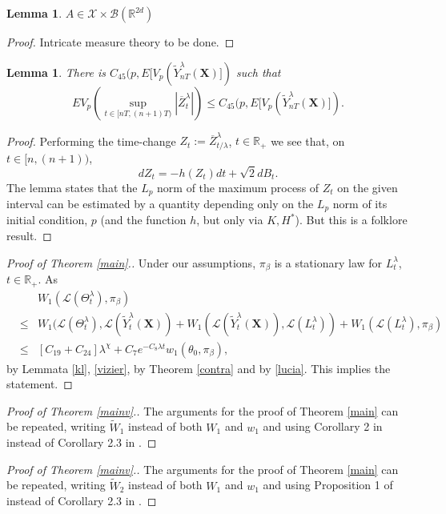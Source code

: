 \documentclass[a4paper,draft]{article}
\newtheorem{lemma}[theorem]{Lemma}
\begin{document}
\begin{lemma}
$A\in\mathcal{X}\times \mathcal{B}(\mathbb{R}^{2d})$
\end{lemma}
\begin{proof} Intricate measure theory to be done.
\end{proof}


\begin{lemma}\label{folklore} There is 
$C_{45}(p,E[V_p(\tilde{Y}^{\lambda}_{nT}(\mathbf{X})])$ such that
$$
EV_p(\sup_{t\in [nT,(n+1)T)}|\overline{Z}^{\lambda}_t|)\leq C_{45}(p,E[V_p(\tilde{Y}^{\lambda}_{nT}(\mathbf{X})]).
$$
\end{lemma}
\begin{proof}
Performing the time-change $Z_t:=\overline{Z}^{\lambda}_{t/\lambda}$, $t\in\mathbb{R}_+$ we see
that, on $t\in [n,(n+1))$,
$$
dZ_t=-h(Z_t)dt+\sqrt{2}dB_t.
$$
The lemma states that the $L_p$ norm of the maximum process of $Z_t$ on the given interval can be
estimated by a quantity depending only on the $L_p$ norm of its initial condition, $p$ (and the
function $h$, but only via $K,H^*$). But this is a folklore result.
\end{proof}


\begin{proof}[Proof of Theorem \ref{main}.]
Under our assumptions, $\pi_{\beta}$ is a stationary law for $L^{\lambda}_t$, $t\in\mathbb{R}_+$.
As \begin{eqnarray*}
& & W_1(\mathcal{L}(\Theta^{\lambda}_t),\pi_{\beta})\\
&\leq& W_1(\mathcal{L}(\Theta^{\lambda}_t),\mathcal{L}(\tilde{Y}^{\lambda}_t(\mathbf{X}))
+ W_1(\mathcal{L}(\tilde{Y}^{\lambda}_t(\mathbf{X})),\mathcal{L}(L^{\lambda}_t))+
W_1(\mathcal{L}(L^{\lambda}_t),\pi_{\beta}) \\
&\leq& [C_{19}+C_{24}]\lambda^{\chi}+C_7 e^{-C_8\lambda t}w_1(\theta_0,\pi_{\beta}),
\end{eqnarray*}
by Lemmata \ref{kl}, \ref{vizier}, by Theorem \ref{contra} and by \eqref{lucia}.
This implies the statement.
\end{proof}

\begin{proof}[Proof of Theorem \ref{mainv}.] 
The arguments for the proof of Theorem \ref{main} can be repeated, writing 
$\tilde{W}_1$ instead of both $W_1$ and $w_1$ and using Corollary 2 in \cite{eberleold} instead of Corollary 2.3
in \cite{eberle}.
\end{proof}

\begin{proof}[Proof of Theorem \ref{mainv}.] 
The arguments for the proof of Theorem \ref{main} can be repeated, writing 
$\tilde{W}_2$ instead of both $W_1$ and $w_1$ and using Proposition 1 of \cite{aew} instead of Corollary 2.3
in \cite{eberle}.
\end{proof}
\end{document}
